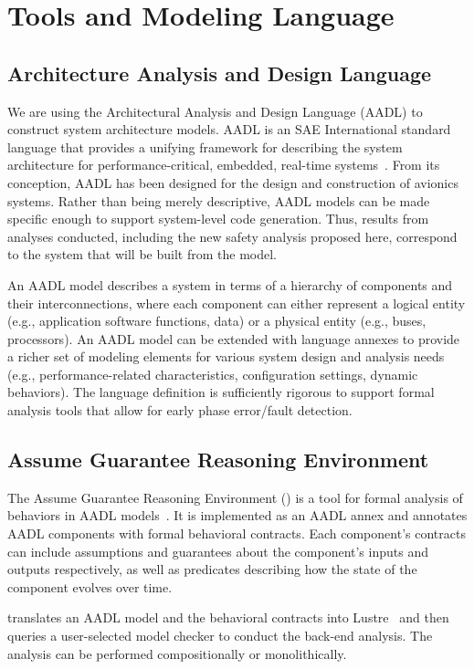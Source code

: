 \section{Tools and Modeling Language}

\subsection{Architecture Analysis and Design Language}
We are using the Architectural Analysis and Design Language (AADL) to construct system architecture models.  AADL is an SAE International standard language that provides a unifying framework for describing the system architecture for performance-critical, embedded, real-time systems~\cite{AADL_Standard,FeilerModelBasedEngineering2012}. From its conception, AADL has been designed for the design and construction of avionics systems.  Rather than being merely descriptive, AADL models can be made specific enough to support system-level code generation.  Thus, results from analyses conducted, including the new safety analysis proposed here, correspond to the system that will be built from the model.  
 
An AADL model describes a system in terms of a hierarchy of components and their interconnections, where each component can either represent a logical entity (e.g., application software functions, data) or a physical entity (e.g., buses, processors). An AADL model can be extended with language annexes to provide a richer set of modeling elements for various system design and analysis needs (e.g., performance-related characteristics, configuration settings, dynamic behaviors). The language definition is sufficiently rigorous to support formal analysis tools that allow for early phase error/fault detection.

\subsection{Assume Guarantee Reasoning Environment}
The Assume Guarantee Reasoning Environment (\agree) is a tool for formal analysis of behaviors in AADL models~\cite{NFM2012:CoGaMiWhLaLu}.  It is implemented as an AADL annex and annotates AADL components with formal behavioral contracts. Each component's contracts can include assumptions and guarantees about the component's inputs and outputs respectively, as well as predicates describing how the state of the component evolves over time.

\agree translates an AADL model and the behavioral contracts into Lustre~\cite{Halbwachs91:IEEE} and then queries a user-selected model checker to conduct the back-end analysis. The analysis can be performed compositionally or monolithically.

